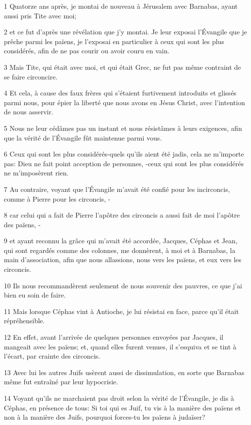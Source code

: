 \par 1 Quatorze ans après, je montai de nouveau à Jérusalem avec Barnabas, ayant aussi pris Tite avec moi;
\par 2 et ce fut d'après une révélation que j'y montai. Je leur exposai l'Évangile que je prêche parmi les païens, je l'exposai en particulier à ceux qui sont les plus considérés, afin de ne pas courir ou avoir couru en vain.
\par 3 Mais Tite, qui était avec moi, et qui était Grec, ne fut pas même contraint de se faire circoncire.
\par 4 Et cela, à cause des faux frères qui s'étaient furtivement introduits et glissés parmi nous, pour épier la liberté que nous avons en Jésus Christ, avec l'intention de nous asservir.
\par 5 Nous ne leur cédâmes pas un instant et nous résistâmes à leurs exigences, afin que la vérité de l'Évangile fût maintenue parmi vous.
\par 6 Ceux qui sont les plus considérés-quels qu'ils aient été jadis, cela ne m'importe pas: Dieu ne fait point acception de personnes, -ceux qui sont les plus considérés ne m'imposèrent rien.
\par 7 Au contraire, voyant que l'Évangile m'avait été confié pour les incirconcis, comme à Pierre pour les circoncis, -
\par 8 car celui qui a fait de Pierre l'apôtre des circoncis a aussi fait de moi l'apôtre des païens, -
\par 9 et ayant reconnu la grâce qui m'avait été accordée, Jacques, Céphas et Jean, qui sont regardés comme des colonnes, me donnèrent, à moi et à Barnabas, la main d'association, afin que nous allassions, nous vers les païens, et eux vers les circoncis.
\par 10 Ils nous recommandèrent seulement de nous souvenir des pauvres, ce que j'ai bien eu soin de faire.
\par 11 Mais lorsque Céphas vint à Antioche, je lui résistai en face, parce qu'il était répréhensible.
\par 12 En effet, avant l'arrivée de quelques personnes envoyées par Jacques, il mangeait avec les païens; et, quand elles furent venues, il s'esquiva et se tint à l'écart, par crainte des circoncis.
\par 13 Avec lui les autres Juifs usèrent aussi de dissimulation, en sorte que Barnabas même fut entraîné par leur hypocrisie.
\par 14 Voyant qu'ils ne marchaient pas droit selon la vérité de l'Évangile, je dis à Céphas, en présence de tous: Si toi qui es Juif, tu vis à la manière des païens et non à la manière des Juifs, pourquoi forces-tu les païens à judaïser?
